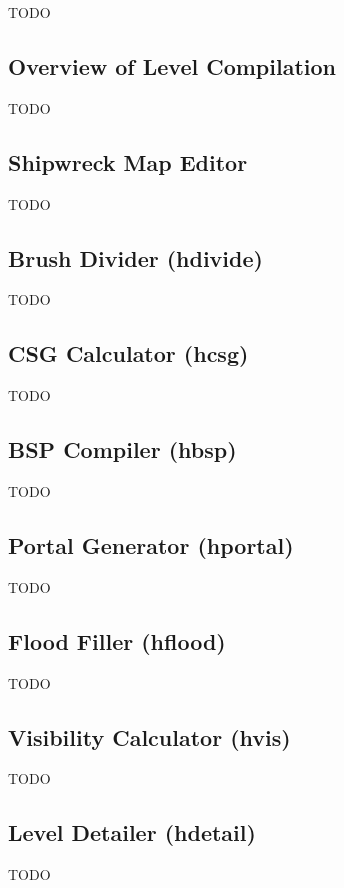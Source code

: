 TODO

\subsection{Overview of Level Compilation}

TODO

\subsection{Shipwreck Map Editor}

TODO

\subsection{Brush Divider (hdivide)}

TODO

\subsection{CSG Calculator (hcsg)}

TODO

\subsection{BSP Compiler (hbsp)}

TODO

\subsection{Portal Generator (hportal)}

TODO

\subsection{Flood Filler (hflood)}

TODO

\subsection{Visibility Calculator (hvis)}

TODO

\subsection{Level Detailer (hdetail)}

TODO

